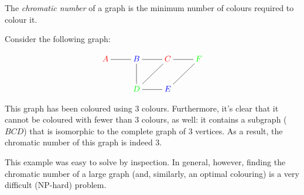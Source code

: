 \documentclass{article}
\begin{document}
The \emph{chromatic number} of a graph is the minimum number of colours required to colour it.

Consider the following graph:

$$\xymatrix{
{\color{red}A} \ar@{-}[r] & {\color{blue}B} \ar@{-}[r] \ar@{-}[d] & {\color{red}C} \ar@{-}[r] \ar@{-}[dl] & {\color{green}F} \ar@{-}[dl] \\
& {\color{green}D} \ar@{-}[r] & {\color{blue}E} & }$$

This graph has been coloured using $3$ colours.  Furthermore, it's clear that it cannot be coloured with fewer than $3$ colours, as well: it contains a subgraph ($BCD$) that is isomorphic to the complete graph of $3$ vertices.  As a result, the chromatic number of this graph is indeed $3$.

This example was easy to solve by inspection.  In general, however, finding the chromatic number of a large graph (and, similarly, an optimal colouring) is a very difficult (NP-hard) problem.
\end{document}
